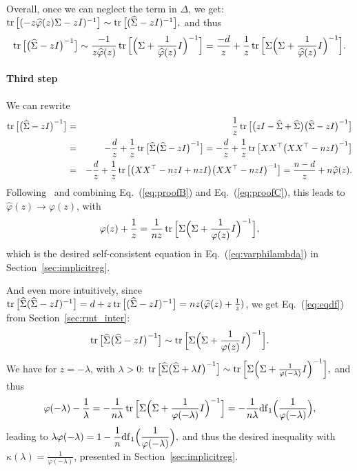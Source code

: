 \documentclass[11pt]{article}
\newcommand{\BEA}{\begin{eqnarray}}
\newcommand{\EEA}{\end{eqnarray}}
\newcommand{\BEQ}{\begin{equation}}
\newcommand{\EEQ}{\end{equation}}
\newcommand{\tr}{\mathop{ \rm tr}}
\newcommand{\idm}{I}
\newcommand{\ds}{\displaystyle }
\newcommand{\mysec}[1]{Section~\ref{sec:#1}}
\newcommand{\eq}[1]{Eq.~(\ref{eq:#1})}
\def \hphi{ \widehat{\varphi} }
\def \hS{ \widehat{ \Sigma} }
\def \S{  { \Sigma} }
\begin{document}
Overall, once we can neglect the term in $\Delta$,  we  get:
$
\tr\big[  ( -    z \hphi(z) \S -   z \idm)^{-1} \big] \sim 
 \tr \big[  ( \hS    -   z \idm)^{-1} \big] ,
$
and thus
\BEQ
\label{eq:proofB}
 \tr \big[ \big(  \hS -   z \idm \big)^{-1} \big] 
\sim \frac{- 1}{z\hphi(z)}  \tr\Big[  \Big(  \S +  \frac{1}{\hphi(z)} \idm \Big)^{-1} \Big]
= \frac{- d}{z } +  \frac{1}{z} \tr\Big[  \S \Big(  \S +  \frac{1}{\hphi(z)} \idm \Big)^{-1} \Big].
\EEQ

\paragraph{Third step}
We can rewrite
\BEA
\notag
 \tr \big[ \big(  \hS   -   z \idm \big)^{-1} \big]
& = &  \frac{1}{z}  \tr \big[ \big( z \idm - \hS      + \hS   \big) \big(  \hS    -   z \idm \big)^{-1} \big] \\
\notag & = &  - \frac{d}{z} 
+ \frac{1}{z}  \tr \big[   \hS    \big(  \hS    -   z \idm \big)^{-1} \big] =  - \frac{d}{z} 
+ \frac{1}{z}  \tr \big[    X   X^\top  \big(  X   X^\top-   nz \idm \big)^{-1} \big] \\
\label{eq:proofC} & = &  - \frac{d}{z} 
+ \frac{1}{z}  \tr \big[    \big( X   X^\top -nz \idm + nz \idm\big)  \big(  X  X^\top-   nz \idm \big)^{-1} \big]
= \frac{n-d}{z} 
+ n \hphi(z).
 \EEA
 Following~\cite{silverstein1995strong} and combining \eq{proofB} and \eq{proofC}, this leads to $\hphi(z) \to  {\varphi}(z)$, with 
 \BEQ
\label{eq:proofE}  \varphi(z)  + \frac{1}{z} = \frac{1}{nz} \tr\Big[  \S \Big(  \S +  \frac{1}{\varphi(z)} \idm \Big)^{-1} \Big],
  \EEQ
  which is the desired self-consistent equation in \eq{varphilambda} in \mysec{implicitreg}.
  
And even more intuitively, since $\tr \big[ \hS ( \hS - z \idm)^{-1} \big]
= d + z \tr \big[  ( \hS - z \idm)^{-1} \big] = nz ( \hphi(z)+ \frac{1}{z})$, we get \eq{eqdf} from \mysec{rmt_inter}:
 \BEQ
\label{eq:proofF} \tr\big[  \hS \big(   \hS - z\idm \big)^{-1} \big] 
 \sim\tr\Big[  \S \Big(  \S +  \frac{1}{\varphi(z)} \idm \Big)^{-1} \Big].
 \EEQ
 We have for $z = -\lambda$, with $\lambda>0$:
  $\tr\big[  \hS \big(   \hS + \lambda \idm \big)^{-1} \big] 
 \sim\tr\Big[  \S \Big(  \S +  \frac{1}{\varphi(-\lambda)} \idm \Big)^{-1} \Big] ,$ and thus
$$
 \varphi(-\lambda)  - \frac{1}{\lambda} = - \frac{1}{n\lambda} \tr\Big[  \S \Big(  \S +  \frac{1}{\varphi(-\lambda)} \idm \Big)^{-1} \Big] = - \frac{1}{n\lambda}  {\rm df}_1\Big(
 \frac{1}{\varphi(-\lambda)}
 \Big),
 $$
 leading to $\ds\lambda \varphi(-\lambda) = 1 - \frac{1}{n }  {\rm df}_1\Big(
 \frac{1}{\varphi(-\lambda)}
 \Big),$
 and thus the desired inequality with $\kappa(\lambda) = \frac{1}{\varphi(-\lambda)}$, presented in \mysec{implicitreg}.
\end{document}
